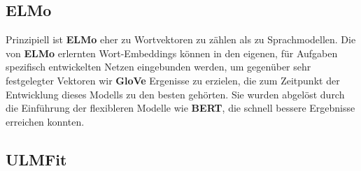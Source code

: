 \subsection{ELMo}
Prinzipiell ist \textbf{ELMo} eher zu Wortvektoren zu z\"ahlen als zu Sprachmodellen. Die von \textbf{ELMo} erlernten Wort-Embeddings k\"onnen in den eigenen, f\"ur Aufgaben spezifisch entwickelten Netzen eingebunden werden, um gegen\"uber sehr festgelegter Vektoren wir \textbf{GloVe} Ergenisse zu erzielen, die zum Zeitpunkt der Entwicklung dieses Modells zu den besten geh\"orten. Sie wurden abgel\"ost durch die Einf\"uhrung der flexibleren Modelle wie \textbf{BERT}, die schnell bessere Ergebnisse erreichen konnten.

\subsection{ULMFit}

